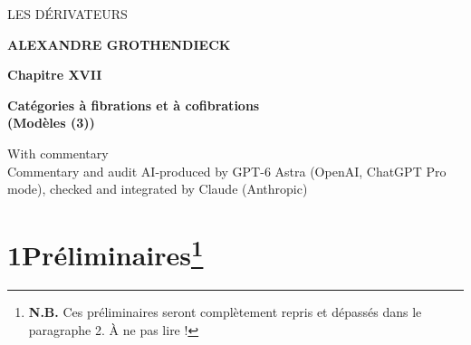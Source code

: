 \dgrchunkbegin

\printedpage{--}

\begin{center}
\vspace*{5cm}

{\Large\textsf{LES DÉRIVATEURS}}

\bigskip

\textbf{ALEXANDRE GROTHENDIECK}

\vspace{2cm}

\textbf{Chapitre XVII}

\medskip

\textbf{Catégories à fibrations et à cofibrations}\\
\textbf{(Modèles (3))}

\bigskip
{\small\textsf{With commentary}}\\[0.6ex]
{\footnotesize Commentary and audit AI-produced by GPT-6 Astra (OpenAI, ChatGPT Pro mode), checked and integrated by Claude (Anthropic)}

\end{center}

\clearpage

\printedpage{--}

\vspace*{5cm}


\clearpage



\section*{1\quad Préliminaires\footnote{\textbf{N.B.} Ces préliminaires seront complètement repris et dépassés dans le paragraphe 2. À ne pas lire !}}

